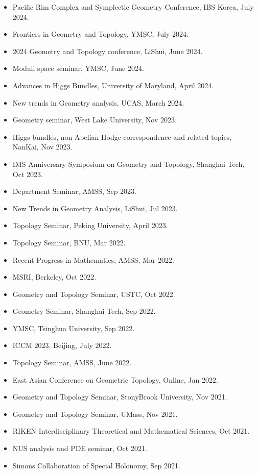 \documentclass[a4paper,10pt]{article}
\begin{document}
\begin{itemize}[leftmargin=1.5cm]
    \item Pacific Rim Complex and Symplectic Geometry Conference, IBS Korea, July 2024.
    \item Frontiers in Geometry and Topology, YMSC, July 2024.
    \item 2024 Geometry and Topology conference, LiShui, June 2024.
    \item Moduli space seminar, YMSC, June 2024.
    \item Advances in Higgs Bundles, University of Maryland, April 2024.
    \item New trends in Geometry analysis, UCAS, March 2024.
    \item Geometry seminar, West Lake University, Nov 2023.
    \item Higgs bundles, non-Abelian Hodge correspondence and related topics, NanKai, Nov 2023.
    \item IMS Anniversary Symposium on Geometry and Topology, Shanghai Tech, Oct 2023.
    \item Department Seminar, AMSS, Sep 2023.
    \item New Trends in Geometry Analysis, LiShui, Jul 2023.
    \item Topology Seminar, Peking University, April 2023.
    \item Topology Seminar, BNU, Mar 2022.
    \item Recent Progress in Mathematics, AMSS, Mar 2022.
    \item MSRI, Berkeley, Oct 2022.
    \item Geometry and Topology Seminar, USTC, Oct 2022.
    \item Geometry Seminar, Shanghai Tech, Sep 2022.
    \item YMSC, Tsinghua University, Sep 2022.
    \item ICCM 2023, Beijing, July 2022.
    \item Topology Seminar, AMSS, June 2022.
    \item East Asian Conference on Geometric Topology, Online, Jan 2022.
    \item Geometry and Topology Seminar, StonyBrook University, Nov 2021.
    \item Geometry and Topology Seminar, UMass, Nov 2021.
    \item RIKEN Interdisciplinary Theoretical and Mathematical Sciences, Oct 2021.
    \item NUS analysis and PDE seminar, Oct 2021.
    \item Simons Collaboration of Special Holonomy, Sep 2021.

\end{itemize}
\end{document}
